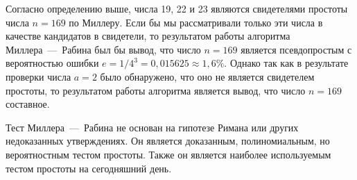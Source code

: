Согласно определению выше, числа 19, 22 и 23 являются свидетелями простоты числа $n=169$ по Миллеру. Если бы мы рассматривали только эти числа в качестве кандидатов в свидетели, то результатом работы алгоритма Миллера~---~Рабина был бы вывод, что число $n=169$ является псевдопростым с вероятностью ошибки $e = 1 / 4^3 = 0{,}015625 \approx 1{,}6\%$. Однако так как в результате проверки числа $a = 2$ было обнаружено, что оно не является свидетелем простоты, то результатом работы алгоритма является вывод, что число $n=169$ составное.
\exampleend

Тест Миллера~---~Рабина не основан на гипотезе Римана или других недоказанных утверждениях. Он является доказанным, полиномиальным, но вероятностным тестом простоты. Также он является наиболее используемым тестом простоты на сегодняшний день.
